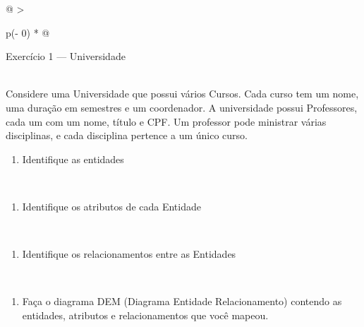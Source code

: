 \documentclass[
]{book}
\providecommand{\tightlist}{%
  \setlength{\itemsep}{0pt}\setlength{\parskip}{0pt}}
\begin{document}
\begin{longtable}[]{@{}
  >{\raggedright\arraybackslash}p{(\columnwidth - 0\tabcolsep) * }@{}}
\toprule\noalign{}
\begin{minipage}[b]{\linewidth}\raggedright
Exercício 1 --- Universidade
\end{minipage} \\
\midrule\noalign{}
\endhead
\bottomrule\noalign{}
\endlastfoot
Considere uma Universidade que possui vários Cursos. Cada curso tem um nome, uma duração em semestres e um coordenador. A universidade possui Professores, cada um com um nome, título e CPF. Um professor pode ministrar várias disciplinas, e cada disciplina pertence a um único curso. \\
\begin{minipage}[t]{\linewidth}\raggedright
\begin{enumerate}
\def\labelenumi{\alph{enumi})}
\tightlist
\item
  Identifique as entidades
\end{enumerate}
\end{minipage} \\
\begin{minipage}[t]{\linewidth}\raggedright
\begin{enumerate}
\def\labelenumi{\alph{enumi})}
\setcounter{enumi}{1}
\tightlist
\item
  Identifique os atributos de cada Entidade
\end{enumerate}
\end{minipage} \\
\begin{minipage}[t]{\linewidth}\raggedright
\begin{enumerate}
\def\labelenumi{\alph{enumi})}
\setcounter{enumi}{2}
\tightlist
\item
  Identifique os relacionamentos entre as Entidades
\end{enumerate}
\end{minipage} \\
\begin{minipage}[t]{\linewidth}\raggedright
\begin{enumerate}
\def\labelenumi{\alph{enumi})}
\setcounter{enumi}{4}
\tightlist
\item
  Faça o diagrama DEM (Diagrama Entidade Relacionamento) contendo as entidades, atributos e relacionamentos que você mapeou.
\end{enumerate}
\end{minipage} \\
\end{longtable}
\end{document}
